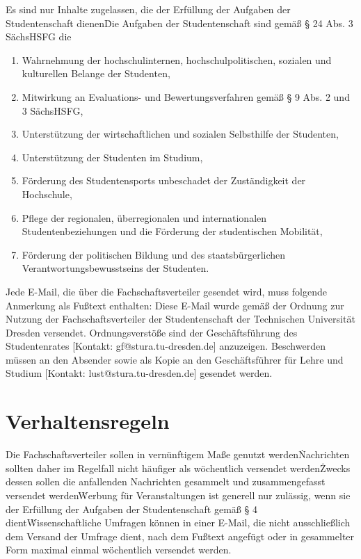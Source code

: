 \begin{multicols}{2}
\Abs \Satz Es sind nur Inhalte zugelassen, die der Erfüllung der Aufgaben der Studentenschaft dienen\.
Die Aufgaben der Studentenschaft sind gemäß § 24 Abs. 3 SächsHSFG die
\begin{enumerate}
\item Wahrnehmung der hochschulinternen, hochschulpolitischen, sozialen und kulturellen Belange der Studenten,
\item Mitwirkung an Evaluations- und Bewertungsverfahren gemäß § 9 Abs. 2 und 3 SächsHSFG,
\item Unterstützung der wirtschaftlichen und sozialen Selbsthilfe der Studenten,
\item Unterstützung der Studenten im Studium,
\item Förderung des Studentensports unbeschadet der Zuständigkeit der Hochschule,
\item Pflege der regionalen, überregionalen und internationalen Studentenbeziehungen und die Förderung der studentischen Mobilität,
\item Förderung der politischen Bildung und des staatsbürgerlichen Verantwortungsbewusstseins der Studenten.
\end{enumerate}
Jede E-Mail, die über die Fachschaftsverteiler gesendet wird, muss folgende Anmerkung als Fußtext enthalten:
Diese E-Mail wurde gemäß der Ordnung zur Nutzung der Fachschaftsverteiler der Studentenschaft der Technischen Universität Dresden versendet. Ordnungsverstöße sind der Geschäftsführung des Studentenrates [Kontakt: gf@stura.tu-dresden.de] anzuzeigen. Beschwerden müssen an den Absender sowie als Kopie an den Geschäftsführer für Lehre und Studium [Kontakt: lust@stura.tu-dresden.de] gesendet werden.

\section{Verhaltensregeln}

\Abs \Satz Die Fachschaftsverteiler sollen in vernünftigem Maße genutzt werden\. Nachrichten sollten daher im Regelfall nicht häufiger als wöchentlich versendet werden\. Zwecks dessen sollen die anfallenden Nachrichten gesammelt und zusammengefasst versendet werden\. Werbung für Veranstaltungen ist generell nur zulässig, wenn sie der Erfüllung der Aufgaben der Studentenschaft gemäß § 4 dient\. Wissenschaftliche Umfragen können in einer E-Mail, die nicht ausschließlich dem Versand der Umfrage dient, nach dem Fußtext angefügt oder in gesammelter Form maximal einmal wöchentlich versendet werden.


\end{multicols}
